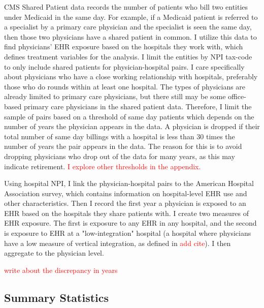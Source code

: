 \documentclass[11pt]{article}
\begin{document}
CMS Shared Patient data records the number of patients who bill two entities under Medicaid in the same day. For example, if a Medicaid patient is referred to a specialist by a primary care physician and the specialist is seen the same day, then those two physicians have a shared patient in common. I utilize this data to find physicians' EHR exposure based on the hospitals they work with, which defines treatment variables for the analysis. I limit the entities by NPI tax-code to only include shared patients for physician-hospital pairs. I care specifically about physicians who have a close working relationship with hospitals, preferably those who do rounds within at least one hospital. The types of physicians are already limited to primary care physicians, but there still may be some office-based primary care physicians in the shared patient data. Therefore, I limit the sample of pairs based on a threshold of same day patients which depends on the number of years the physician appears in the data. A physician is dropped if their total number of same day billings with a hospital is less than 30 times the number of years the pair appears in the data. The reason for this is to avoid dropping physicians who drop out of the data for many years, as this may indicate retirement. \textcolor{red}{I explore other thresholds in the appendix.} 

Using hospital NPI, I link the physician-hospital pairs to the American Hospital Association survey, which contains information on hospital-level EHR use and other characteristics. Then I record the first year a physician is exposed to an EHR based on the hospitals they share patients with. I create two measures of EHR exposure. The first is exposure to any EHR in any hospital, and the second is exposure to EHR at a "low-integration" hospital (a hospital where physicians have a low measure of vertical integration, as defined in \textcolor{red}{add cite}). I then aggregate to the physician level. 

\textcolor{red}{write about the discrepancy in years}

\subsection{Summary Statistics}
\end{document}
